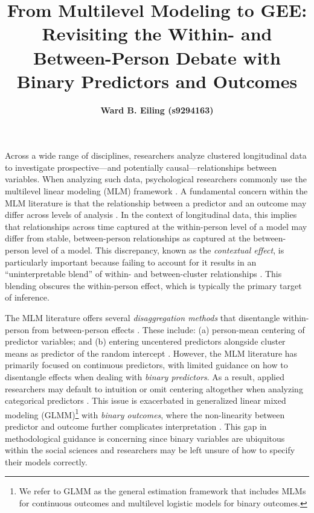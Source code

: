 \documentclass[stu]{apa7}
\title{From Multilevel Modeling to GEE: Revisiting the Within- and Between-Person Debate with Binary Predictors and Outcomes}
\author{\textbf{Ward B. Eiling (s9294163)} \vspace{1cm}}
\begin{document}
\maketitle



Across a wide range of disciplines, researchers analyze clustered longitudinal data to investigate prospective---and potentially causal---relationships between variables. When analyzing such data, psychological researchers commonly use the multilevel linear modeling (MLM) framework \parencite[]{bauer_fitting_2011}. A fundamental concern within the MLM literature is that the relationship between a predictor and an outcome may differ across levels of analysis \parencite[e.g.,][]{enders_centering_2007, kreft_effect_1995, raudenbush_hierarchical_2002}. In the context of longitudinal data, this implies that relationships across time captured at the within-person level of a model may differ from stable, between-person relationships as captured at the between-person level of a model. This discrepancy, known as the \textit{contextual effect}, is particularly important because failing to account for it results in an ``uninterpretable blend'' of within- and between-cluster relationships \parencite[139]{raudenbush_hierarchical_2002}. This blending obscures the within-person effect, which is typically the primary target of inference.


The MLM literature offers several \textit{disaggregation methods} that disentangle within-person from between-person effects \parencite[]{curran_disaggregation_2011}. These include: (a) person-mean centering of predictor variables; and (b) entering uncentered predictors alongside cluster means as predictor of the random intercept \parencite[]{kreft_effect_1995, raudenbush_hierarchical_2002, bell_explaining_2015}. However, the MLM literature has primarily focused on continuous predictors, with limited guidance on how to disentangle effects when dealing with \textit{binary predictors}. As a result, applied researchers may default to intuition or omit centering altogether when analyzing categorical predictors \parencite[]{yaremych_centering_2023}. This issue is exacerbated in generalized linear mixed modeling (GLMM)\footnote{We refer to GLMM as the general estimation framework that includes MLMs for continuous outcomes and multilevel logistic models for binary outcomes.} with \textit{binary outcomes}, where the non-linearity between predictor and outcome further complicates interpretation \parencite[]{austin_intermediate_2017, bolger_intensive_2013}. This gap in methodological guidance is concerning since binary variables are ubiquitous within the social sciences and researchers may be left unsure of how to specify their models correctly. 
\end{document}
